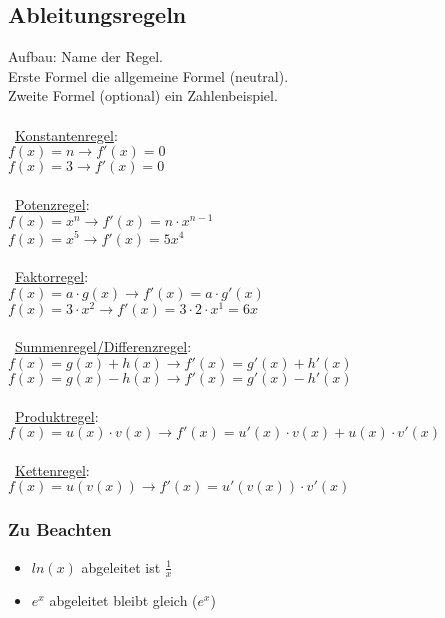 \subsection{Ableitungsregeln}
Aufbau: Name der Regel. \\
Erste Formel die allgemeine Formel (neutral). \\
Zweite Formel (optional) ein Zahlenbeispiel. \\\\
\
\underline{Konstantenregel}: \\
$f(x) = n \rightarrow f'(x) = 0$ \\
$f(x) = 3 \rightarrow f'(x) = 0$ \\\\
\
\underline{Potenzregel}: \\
$f(x) = x^n \rightarrow f'(x) = n\cdot x^{n - 1}$ \\
$f(x) = x^5 \rightarrow f'(x) = 5x^{4}$ \\\\
\
\underline{Faktorregel}: \\
$f(x) = a\cdot g(x) \rightarrow f'(x) = a\cdot g'(x)$ \\
$f(x) = 3\cdot x^2 \rightarrow f'(x) = 3\cdot 2\cdot x^1 = 6x$ \\\\
\
\underline{Summenregel/Differenzregel}: \\
$f(x) = g(x) + h(x) \rightarrow f'(x) = g'(x) + h'(x)$ \\
$f(x) = g(x) - h(x) \rightarrow f'(x) = g'(x) - h'(x)$ \\\\
\
\underline{Produktregel}: \\
$f(x) = u(x) \cdot v(x) \rightarrow f'(x) = u'(x) \cdot v(x) + u(x) \cdot v'(x)$ \\\\
\
\underline{Kettenregel}: \\
$f(x) = u(v(x)) \rightarrow f'(x) = u'(v(x)) \cdot v'(x)$

\subsubsection{Zu Beachten}
\begin{itemize}
    \item $ln(x)$ abgeleitet ist $\frac{1}{x}$
    \item $e^x$ abgeleitet bleibt gleich ($e^x$)
\end{itemize}
